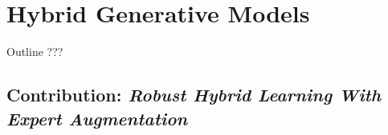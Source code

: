 \chapter{Hybrid Generative Models}\label{ch:07}

\begin{remark}{Outline}
???
\end{remark}

\section{Contribution: \textit{Robust Hybrid Learning With Expert Augmentation}}
